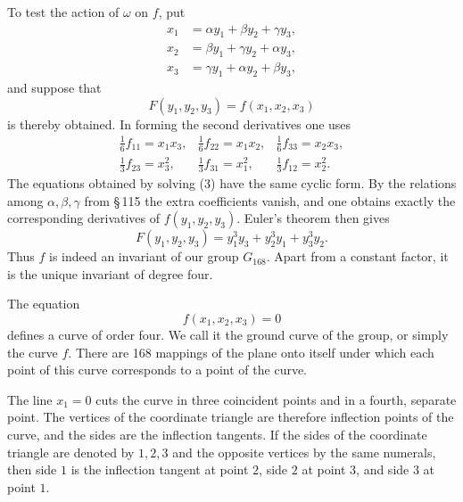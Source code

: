 \documentclass[11pt]{article}
\begin{document}
To test the action of \(\omega\) on \(f\), put
\begin{equation}
\begin{aligned}
x_1&=\alpha y_1+\beta y_2+\gamma y_3,\\
x_2&=\beta y_1+\gamma y_2+\alpha y_3,\\
x_3&=\gamma y_1+\alpha y_2+\beta y_3,
\end{aligned}
\tag{3}
\end{equation}
and suppose that
\begin{equation}
F(y_1,y_2,y_3)=f(x_1,x_2,x_3)
\tag{4}
\end{equation}
is thereby obtained. In forming the second derivatives one uses
\begin{equation}
\begin{array}{lll}
\frac16 f_{11}=x_1x_3,&\frac16 f_{22}=x_1x_2,&\frac16 f_{33}=x_2x_3,\\[2mm]
\frac13 f_{23}=x_3^2,&\frac13 f_{31}=x_1^2,&\frac13 f_{12}=x_2^2.
\end{array}
\end{equation}
The equations obtained by solving (3) have the same cyclic form. By the relations among \(\alpha,\beta,\gamma\) from \S\,115 the extra coefficients vanish, and one obtains exactly the corresponding derivatives of \(f(y_1,y_2,y_3)\). Euler's theorem then gives
\begin{equation}
F(y_1,y_2,y_3)=y_1^3y_3+y_2^3y_1+y_3^3y_2.
\end{equation}
Thus \(f\) is indeed an invariant of our group \(G_{168}\). Apart from a constant factor, it is the unique invariant of degree four.

The equation
\begin{equation}
f(x_1,x_2,x_3)=0
\tag{5}
\end{equation}
defines a curve of order four. We call it the ground curve of the group, or simply the curve \(f\). There are 168 mappings of the plane onto itself under which each point of this curve corresponds to a point of the curve.

The line \(x_1=0\) cuts the curve in three coincident points and in a fourth, separate point. The vertices of the coordinate triangle are therefore inflection points of the curve, and the sides are the inflection tangents. If the sides of the coordinate triangle are denoted by \(1,2,3\) and the opposite vertices by the same numerals, then side \(1\) is the inflection tangent at point \(2\), side \(2\) at point \(3\), and side \(3\) at point \(1\).
\end{document}
